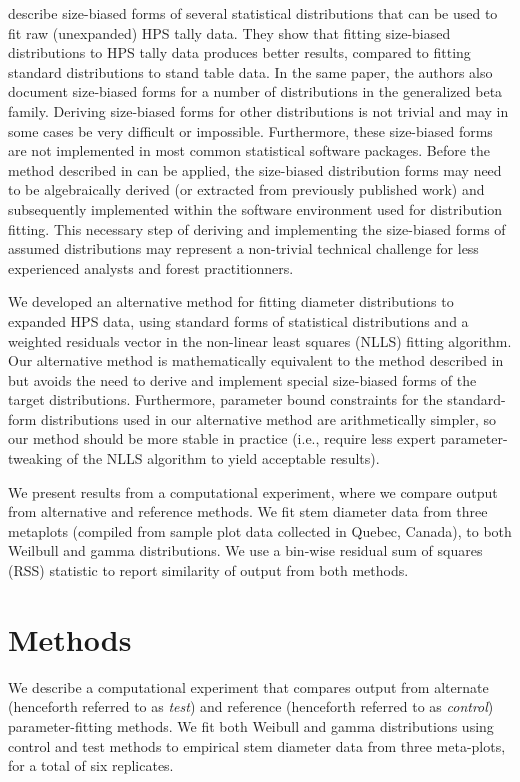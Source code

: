 \documentclass{foresj}
\begin{document}
\citet{ducey2015sizebiased} describe size-biased forms of several statistical distributions that can be used to fit raw (unexpanded) HPS tally data.
They show that fitting size-biased distributions to HPS tally data
produces better results, compared to fitting standard distributions to
stand table data.
In the same paper, the authors also document size-biased forms for a
number of distributions in the generalized beta family.
Deriving size-biased forms for other distributions is not trivial and
may in some cases be very difficult or impossible. 
Furthermore, these size-biased forms are not implemented in most common statistical software packages. 
Before the method described in \citet{ducey2015sizebiased} can be applied, the size-biased distribution forms may need to be algebraically derived (or
extracted from previously published work) and subsequently implemented within the software environment
used for distribution fitting.
This necessary step of deriving and
implementing the size-biased forms of assumed distributions may represent a
non-trivial technical challenge for less experienced analysts and
forest practitionners.

We developed an alternative method for fitting diameter distributions
to expanded HPS data, using standard forms of statistical
distributions and a weighted residuals vector in the non-linear
least squares (NLLS) fitting algorithm.
Our alternative method is mathematically equivalent to the method
described in \citet{ducey2015sizebiased} but avoids the need to
derive and implement special size-biased forms of the target
distributions.
Furthermore, parameter bound constraints for the standard-form
distributions used in our alternative method are arithmetically
simpler, so our method should be more stable in practice (i.e., require less expert parameter-tweaking
of the NLLS algorithm to yield acceptable results).

We present results from a computational experiment, where we compare
output from alternative and reference methods.
We fit stem diameter data from three metaplots (compiled from sample plot
data collected in Quebec, Canada), to both Weilbull and gamma
distributions. We use a bin-wise residual sum of squares (RSS)
statistic to report similarity of output from both methods.

\section{Methods}
\label{sec:methods}

We describe a computational experiment that compares output from
alternate (henceforth referred to as \emph{test}) and reference
(henceforth referred to as \emph{control}) parameter-fitting methods. 
We fit both Weibull and gamma distributions using control
and test methods to empirical stem
diameter data from three meta-plots, for a total of six replicates.
\end{document}
